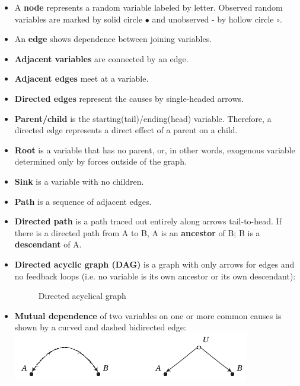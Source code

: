 \begin{itemize}

\item A \textbf{node} represents a random variable labeled by letter. Observed random variables are marked by solid circle $\bullet$ and unobserved - by hollow circle \( \circ \).

\item An \textbf{edge} shows dependence between joining variables.

\item \textbf{Adjacent variables} are connected by an edge.

\item \textbf{Adjacent edges} meet at a variable.

\item \textbf{Directed edges} represent the causes by single-headed arrows.

\item \textbf{Parent/child} is the starting(tail)/ending(head) variable. Therefore, a directed edge represents a direct effect of a parent on a child.

\item \textbf{Root} is a variable that has no parent, or, in other words, exogenous variable determined only by forces outside of the graph.

\item \textbf{Sink} is a variable with no children.

\item \textbf{Path} is a sequence of adjacent edges.

\item \textbf{Directed path} is a path traced out entirely along arrows tail-to-head. If there is a directed path from A to B,  A is an \textbf{ancestor} of B; B is a  \textbf{descendant} of A.\\

\item \textbf{Directed acyclic graph (DAG)} is a graph with only arrows for edges and no feedback loops (i.e. no variable is its own ancestor or its own descendant):\\

\begin{figure}[htp]\centering
\caption{Directed acyclical graph}\vspace{0.3cm}
\end{figure}

\item \textbf{Mutual dependence} of two variables on one or more common causes is shown by a curved and dashed bidirected edge:\\
\includegraphics[trim=0 -1cm 0 -1cm, center]{../material/fig-graph-shorthand-unobserved-common-cause.png}

\end{itemize}

